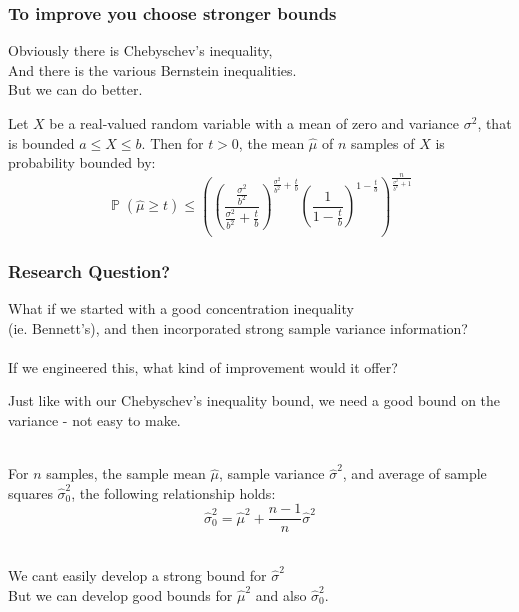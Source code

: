 \documentclass{beamer}
\DeclareMathOperator{\p}{\mathbb{P}}
\begin{document}
\begin{frame}
\frametitle{To improve you choose stronger bounds}
Obviously there is Chebyschev's inequality,\\
And there is the various Bernstein inequalities.\\
But we can do better.

\begin{theorem}\label{hoeffdings1}
Let $X$ be a real-valued random variable with a mean of zero and variance $\sigma^2$, that is bounded $a\le X\le b$. 
Then for $t>0$, the mean $\hat{\mu}$ of $n$ samples of $X$ is probability bounded by:
\begin{equation*}\label{eq_no2}\p(\hat{\mu}\ge t)\le 
\left(\left(\frac{\frac{\sigma^2}{b^2}}{\frac{\sigma^2}{b^2}+\frac{t}{b}}\right)^{\frac{\sigma^2}{b^2}+\frac{t}{b}}
\left(\frac{1}{1-\frac{t}{b}}\right)^{1-\frac{t}{b}}\right)^{\frac{n}{\frac{\sigma^2}{b^2}+1}}
\end{equation*}
\end{theorem}
\end{frame}


\begin{frame}
\frametitle{Research Question?}
What if we started with a good concentration inequality \\(ie. Bennett's), and then incorporated strong sample variance information?\\
\-\hspace{1cm}\\
If we engineered this, what kind of improvement would it offer?
\end{frame}



\begin{frame}
Just like with our Chebyschev's inequality bound, we need a good bound on the variance - not easy to make.\\
\-\hspace{1cm}\\

\begin{lemma}\label{variance1}
For $n$ samples, the sample mean $\hat{\mu}$, sample variance $\hat{\sigma}^2$, and average of sample squares $\hat{\sigma}_0^2$, the following relationship holds:
$$ \hat{\sigma}_0^2=\hat{\mu}^2+\frac{n-1}{n}\hat{\sigma}^2 $$
\end{lemma}
\-\hspace{1cm}\\
We cant easily develop a strong bound for $\hat{\sigma}^2$\\ But we can develop good bounds for $\hat{\mu}^2$ and also $\hat{\sigma}_0^2$.
\end{frame}
\end{document}
